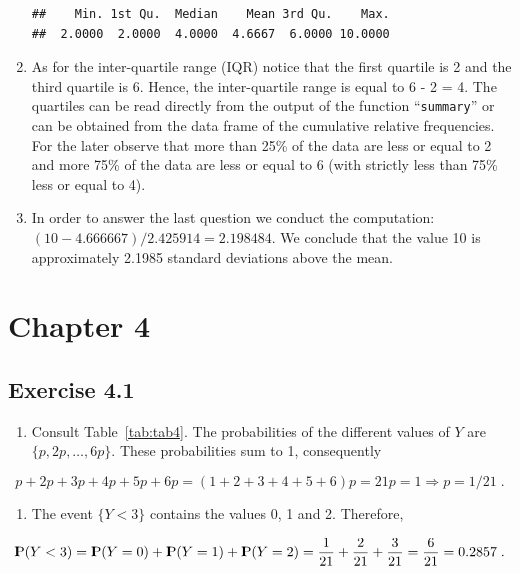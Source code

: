 \documentclass[]{krantz}
\providecommand{\tightlist}{%
  \setlength{\itemsep}{0pt}\setlength{\parskip}{0pt}}
\newcommand{\Prob}{{\rm I\kern-.3em P}}
\theoremstyle{definition}
\theoremstyle{definition}
\theoremstyle{definition}
\theoremstyle{remark}
\begin{document}
\begin{enumerate}
\begin{verbatim}
##    Min. 1st Qu.  Median    Mean 3rd Qu.    Max. 
##  2.0000  2.0000  4.0000  4.6667  6.0000 10.0000
\end{verbatim}
\item
  As for the inter-quartile
  range (IQR) notice that the first quartile is 2 and the third quartile
  is 6. Hence, the inter-quartile range is equal to 6 - 2 = 4. The
  quartiles can be read directly from the output of the function
  ``\texttt{summary}'' or can be obtained from the data frame of the cumulative
  relative frequencies. For the later observe that more than 25\% of the
  data are less or equal to 2 and more 75\% of the data are less or equal
  to 6 (with strictly less than 75\% less or equal to 4).
\item
  In order to answer the last
  question we conduct the computation:
  \((10 - 4.666667)/2.425914 = 2.198484\). We conclude that the value 10 is
  approximately 2.1985 standard deviations above the mean.
\end{enumerate}

\hypertarget{chapter-4}{%
\section*{Chapter 4}\label{chapter-4}}


\hypertarget{exercise-4.1}{%
\subsection*{Exercise 4.1}\label{exercise-4.1}}


\begin{enumerate}
\def\labelenumi{\arabic{enumi}.}
\tightlist
\item
  Consult
  Table~\ref{tab:tab4}. The probabilities of the different values
  of \(Y\) are \(\{p, 2p, \ldots, 6p\}\). These probabilities sum to 1,
  consequently
\end{enumerate}

\[p + 2p + 3 p + 4 p + 5 p + 6p = (1+2+3+4+5+6)p = 21 p = 1 \Longrightarrow p = 1/21\;.\]

\begin{enumerate}
\def\labelenumi{\arabic{enumi}.}
\setcounter{enumi}{1}
\tightlist
\item
  The event \(\{Y < 3\}\) contains
  the values 0, 1 and 2. Therefore,
\end{enumerate}

\[\Prob(Y < 3) = \Prob(Y=0) + \Prob(Y=1) + \Prob(Y=2) = \frac{1}{21} + \frac{2}{21} + \frac{3}{21} = \frac{6}{21}= 0.2857\;.\]
\end{document}
